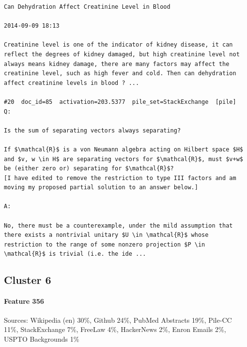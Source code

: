 \begin{verbatim}
Can Dehydration Affect Creatinine Level in Blood

2014-09-09 18:13

Creatinine level is one of the indicator of kidney disease, it can reflect the degrees of kidney damaged, but high creatinine level not always means kidney damage, there are many factors may affect the creatinine level, such as high fever and cold. Then can dehydration affect creatinine levels in blood ? ...

#20  doc_id=85  activation=203.5377  pile_set=StackExchange  [pile]
Q:

Is the sum of separating vectors always separating?

If $\mathcal{R}$ is a von Neumann algebra acting on Hilbert space $H$ and $v, w \in H$ are separating vectors for $\mathcal{R}$, must $v+w$ be (either zero or) separating for $\mathcal{R}$?
[I have edited to remove the restriction to type III factors and am moving my proposed partial solution to an answer below.]

A:

No, there must be a counterexample, under the mild assumption that there exists a nontrivial unitary $U \in \mathcal{R}$ whose restriction to the range of some nonzero projection $P \in \mathcal{R}$ is trivial (i.e. the ide ...

\end{verbatim}

\subsection*{Cluster 6}

\paragraph*{Feature 356} Sources: Wikipedia (en) 30\%, Github 24\%, PubMed Abstracts 19\%, Pile-CC 11\%, StackExchange 7\%, FreeLaw 4\%, HackerNews 2\%, Enron Emails 2\%, USPTO Backgrounds 1\%

